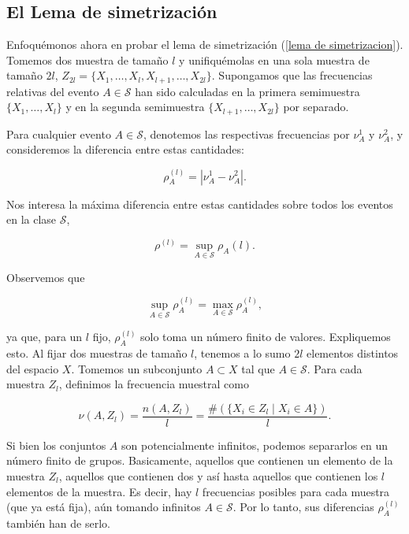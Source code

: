 \documentclass{report}
\begin{document}
\bigskip

\subsection{El Lema de simetrización}

Enfoquémonos ahora en probar el lema de simetrización (\ref{lema de simetrizacion}). Tomemos dos muestra de tamaño $l$ y
unifiquémolas en una sola muestra de tamaño \( 2l \),
\( Z_{2l} = \{ X_1, \dots, X_l, X_{l+1}, \dots, X_{2l} \} \). Supongamos que las frecuencias relativas del evento \( A \in \mathcal{S} \) 
han sido calculadas en la primera semimuestra \( \{ X_1, \dots, X_l \} \) y en la segunda semimuestra \( \{ X_{l+1}, \dots, X_{2l} \} \)
por separado.\newline

Para cualquier evento $A\in\mathcal{S}$, denotemos las respectivas frecuencias por \( \nu_A^{1}\) y \( \nu_A^{2} \), 
y consideremos la diferencia entre estas cantidades:

\[
\rho^{(l)}_A = |\nu_A^{1} - \nu_A^{2}|.
\]

Nos interesa la máxima diferencia entre estas cantidades sobre todos los eventos en la clase \( \mathcal{S} \),

\[
\rho^{(l)} = \sup_{A \in \mathcal{S}} \rho_A(l).
\]

Observemos que 

\[
\sup_{A \in \mathcal{S}} \rho_A^{(l)} = \max_{A \in \mathcal{S}} \rho_A^{(l)},
\]

ya que, para un \( l \) fijo, \( \rho_A^{(l)} \) solo toma un número finito de valores. Expliquemos esto.
Al fijar dos muestras de tamaño $l$, tenemos a lo sumo $2l$ elementos distintos del espacio $X$. Tomemos un
subconjunto $A\subset X$ tal que $A\in\mathcal{S}$. Para cada muestra $Z_l$, definimos la frecuencia muestral
como 

\[
\nu(A,Z_l) = \frac{n(A,Z_l)}{l} = \frac{\#(\{ X_i \in Z_l \mid X_i \in A \})}{l}.
\]

Si bien los conjuntos $A$ son potencialmente infinitos, podemos separarlos en un número finito de grupos. Basicamente,
aquellos que contienen un elemento de la muestra $Z_l$, aquellos que contienen dos y así hasta aquellos que contienen
los $l$ elementos de la muestra. Es decir, hay $l$ frecuencias posibles para cada muestra (que ya está fija), aún
tomando infinitos $A\in\mathcal{S}$. Por lo tanto, sus diferencias $\rho_A^{(l)}$ también han de serlo.\newline
\end{document}
